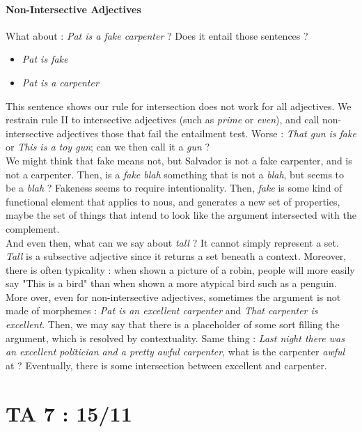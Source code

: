 \documentclass{cours}
\begin{document}
\paragraph{Non-Intersective Adjectives}
What about\! : \textsl{Pat is a fake carpenter} ? Does it entail those sentences ?
\begin{itemize}
    \item \textsl{Pat is fake}
    \item \textsl{Pat is a carpenter}
\end{itemize}
This sentence shows our rule for intersection does not work for all adjectives. We restrain rule II to intersective adjectives (such as \textsl{prime} or \textsl{even}), and call non-intersective adjectives those that fail the entailment test. Worse\! : \textsl{That gun is fake} or \textsl{This is a toy gun}; can we then call it a \textsl{gun} ?\\
We might think that fake means not, but Salvador is not a fake carpenter, and is not a carpenter. Then, is a \textsl{fake blah} something that is not a \textsl{blah}, but seems to be a \textsl{blah} ? Fakeness seems to require intentionality. Then, \textsl{fake} is some kind of functional element that applies to nous, and generates a new set of properties, maybe the set of things that intend to look like the argument intersected with the complement.\\
And even then, what can we say about \textsl{tall} ? It cannot simply represent a set. \textsl{Tall} is a subsective adjective since it returns a set beneath a context. Moreover, there is often typicality\! : when shown a picture of a robin, people will more easily say "This is a bird" than when shown a more atypical bird such as a penguin.\\
More over, even for non-intersective adjectives, sometimes the argument is not made of morphemes\! : \textsl{Pat is an excellent carpenter} and \textsl{That carpenter is excellent}. Then, we may say that there is a placeholder of some sort filling the argument, which is resolved by contextuality. Same thing\! : \textsl{Last night there was an excellent politician and a pretty awful carpenter}, what is the carpenter \textsl{awful} at ? Eventually, there is some intersection between excellent and carpenter.


\section{TA 7\! : 15/11}
\end{document}
